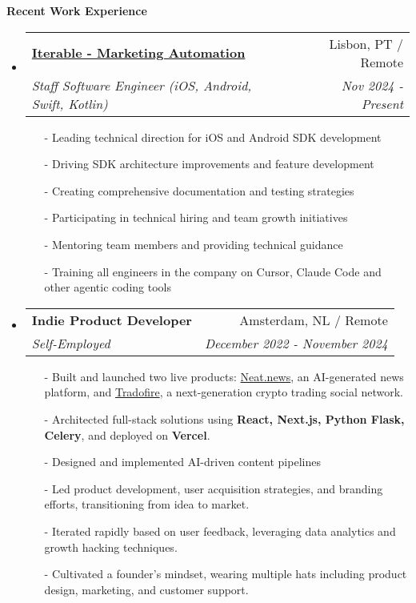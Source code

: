 \documentclass[letterpaper,11pt]{article}
\makeatletter
\newcommand{\resheading}[1]{{\large \colorbox{mygrey}{\begin{minipage}{\textwidth}{\textbf{#1 \vphantom{p\^{E}}}}\end{minipage}}}}
\newcommand{\ressubheading}[4]{
\begin{tabular*}{7.0in}{l@{\extracolsep{\fill}}r}
    \textbf{#1} & #2 \\
    \textit{#3} & \textit{#4} \\
\end{tabular*}\vspace{-6pt}}
\makeatother
\begin{document}
\resheading{Recent Work Experience}
\begin{itemize}

\item
    \ressubheading{\href{https://iterable.com}{Iterable - Marketing Automation}}{Lisbon, PT / Remote}{Staff Software Engineer (iOS, Android, Swift, Kotlin)}{Nov 2024 - Present}
    \begin{itemize}
        \item[-]{Leading technical direction for iOS and Android SDK development}
        \item[-]{Driving SDK architecture improvements and feature development}
        \item[-]{Creating comprehensive documentation and testing strategies}
        \item[-]{Participating in technical hiring and team growth initiatives}
        \item[-]{Mentoring team members and providing technical guidance}
        \item[-]{Training all engineers in the company on Cursor, Claude Code and other agentic coding tools}
    \end{itemize}

\item
    \ressubheading{Indie Product Developer}{Amsterdam, NL / Remote}{Self-Employed}{December 2022 - November 2024}
    \begin{itemize}
        \item[-]{Built and launched two live products: \href{https://neat.news}{Neat.news}, an AI-generated news platform, and \href{https://tradofire.com}{Tradofire}, a next-generation crypto trading social network.}
        \item[-]{Architected full-stack solutions using \textbf{React, Next.js, Python Flask, Celery}, and deployed on \textbf{Vercel}.}
        \item[-]{Designed and implemented AI-driven content pipelines}
        \item[-]{Led product development, user acquisition strategies, and branding efforts, transitioning from idea to market.}
        \item[-]{Iterated rapidly based on user feedback, leveraging data analytics and growth hacking techniques.}
        \item[-]{Cultivated a founder’s mindset, wearing multiple hats including product design, marketing, and customer support.}
    \end{itemize}


\end{itemize}
\end{document}
